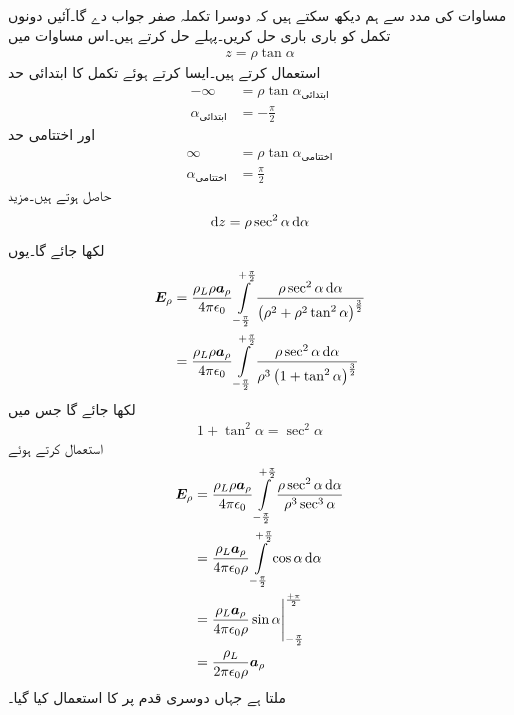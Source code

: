 مساوات  کی مدد سے ہم دیکھ سکتے ہیں کہ دوسرا تکملہ صفر جواب دے گا۔آئیں دونوں تکمل کو باری باری حل کریں۔پہلے \Erho حل کرتے ہیں۔اس مساوات میں
\begin{align*}
z=\rho \tan \alpha
\end{align*}
استعمال کرتے ہیں۔ایسا کرتے ہوئے تکمل کا ابتدائی حد 
\begin{align*}
-\infty &= \rho \tan \alpha_{\text{ابتدائی}}\\
\alpha_{\text{ابتدائی}} &= -\frac{\pi}{2}
\end{align*}
اور اختتامی حد
\begin{align*}
\infty &= \rho \tan \alpha_{\text{اختتامی}}\\
\alpha_{\text{اختتامی}} &= \frac{\pi}{2}
\end{align*}
حاصل ہوتے ہیں۔مزید
\begin{align*}
\dif z=\rho \sec^2 \alpha \dif \alpha
\end{align*}
لکھا جائے گا۔یوں
\begin{align*}
\Erho&=\frac{\rho_L \rho \arho}{4 \pi \epsilon_0}\int\limits_{-\frac{\pi}{2}}^{+\frac{\pi}{2}} \frac{\rho \sec^2 \alpha \dif \alpha}{\left(\rho^2+\rho^2 \tan^2 \alpha \right)^{\frac{3}{2}}}\\
&=\frac{\rho_L \rho \arho}{4 \pi \epsilon_0}\int\limits_{-\frac{\pi}{2}}^{+\frac{\pi}{2}} \frac{\rho \sec^2 \alpha \dif \alpha}{\rho^3 \left(1+ \tan^2 \alpha \right)^{\frac{3}{2}}}
\end{align*}
لکھا جائے گا جس میں
\begin{align*}
1+\tan^2 \alpha=\sec^2 \alpha
\end{align*}
استعمال کرتے ہوئے
\begin{gather}
\begin{aligned}\label{مساوات_کولمب_لامحدود_لکیر_رداسی_میدان}
\Erho&=\frac{\rho_L \rho \arho}{4 \pi \epsilon_0}\int\limits_{-\frac{\pi}{2}}^{+\frac{\pi}{2}} \frac{\rho \sec^2 \alpha \dif \alpha}{\rho^3 \sec^3 \alpha}\\
&=\frac{\rho_L  \arho}{4 \pi \epsilon_0 \rho}\int\limits_{-\frac{\pi}{2}}^{+\frac{\pi}{2}} \cos \alpha \dif \alpha\\
&=\frac{\rho_L  \arho}{4 \pi \epsilon_0 \rho} \eval{\sin \alpha}_{-\frac{\pi}{2}}^{\frac{+\pi}{2}}\\
&=\frac{\rho_L }{2 \pi \epsilon_0 \rho} \arho
\end{aligned}
\end{gather}
ملتا ہے جہاں دوسری  قدم پر  کا استعمال کیا گیا۔

